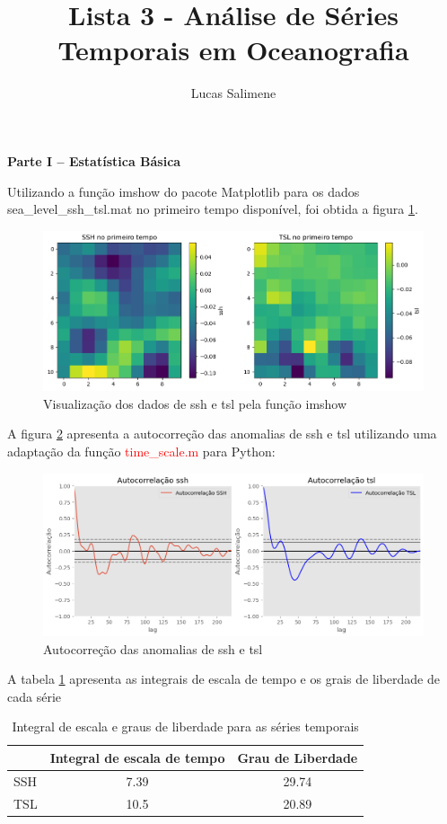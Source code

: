 \documentclass[12pt,a4paper,portuguese]{article}
\title{Lista 3 - Análise de Séries Temporais em Oceanografia}
\author{Lucas Salimene}
\date{}
\begin{document}
	\maketitle
	\newpage
	
	\textbf{Parte I – Estatística Básica}
	
	Utilizando a função imshow do pacote Matplotlib para os dados sea\_level\_ssh\_tsl.mat no primeiro tempo disponível, foi obtida a figura \ref{fig:lista3-1a}.
	
	
\begin{figure}[H]
	\centering
	\includegraphics[width=0.9\linewidth]{lista3-1a}
	\caption{Visualização dos dados de ssh e tsl pela função imshow}
	\label{fig:lista3-1a}
\end{figure}

A figura \ref{fig:lista3-1b} apresenta a autocorreção das anomalias de ssh e tsl utilizando uma adaptação da função \textcolor{red}{time\_scale.m} para Python:

\begin{figure}[H]
	\centering
	\includegraphics[width=0.9\linewidth]{lista3-1b}
	\caption{Autocorreção das anomalias de ssh e tsl}
	\label{fig:lista3-1b}
\end{figure}
A tabela \ref{tsarr} apresenta as integrais de escala de tempo e os grais de liberdade de cada série

\begin{table}[H]
	\centering
	\begin{tabular}{l|c|c|}
		\cline{2-3}
		& \multicolumn{1}{l|}{Integral de escala de tempo} & \multicolumn{1}{l|}{Grau de Liberdade} \\ \hline
		\multicolumn{1}{|l|}{SSH} & 7.39
		                                            & 29.74                                    \\ \hline
		\multicolumn{1}{|l|}{TSL} & 10.5
		                                             & 20.89                                   \\ \hline
	\end{tabular}
	\caption{Integral de escala e graus de liberdade para as séries temporais}
	\label{tsarr}
\end{table}
\end{document}
